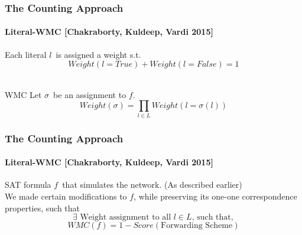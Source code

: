 \documentclass{beamer}
\begin{document}
\begin{frame}
\frametitle{The Counting Approach} %
\framesubtitle{Literal-WMC [Chakraborty, Kuldeep, Vardi 2015]}

	Each literal $l$\ is assigned a weight s.t.\\
	\vspace*{-5pt}
	$$Weight(l=True) + Weight(l=False) = 1$$\\
	\begin{block}{WMC}
	Let $\sigma$\ be an assignment to $ f $.
		$$Weight(\sigma) = \prod_{l \in L}{Weight(l=\sigma(l))}$$
	\end{block}
\end{frame}

\begin{frame}
\frametitle{The Counting Approach}
\framesubtitle{Literal-WMC [Chakraborty, Kuldeep, Vardi 2015]}
	SAT formula $ f $\ that simulates the network. (As described earlier)\\[1ex]
	We made certain modifications to $f$, while preserving its one-one correspondence properties, such that
	$$\exists \text{ Weight assignment to all $l \in L$, such that},$$
	$$WMC(f) = 1-Score(\text{Forwarding Scheme})$$
\end{frame}
\end{document}
